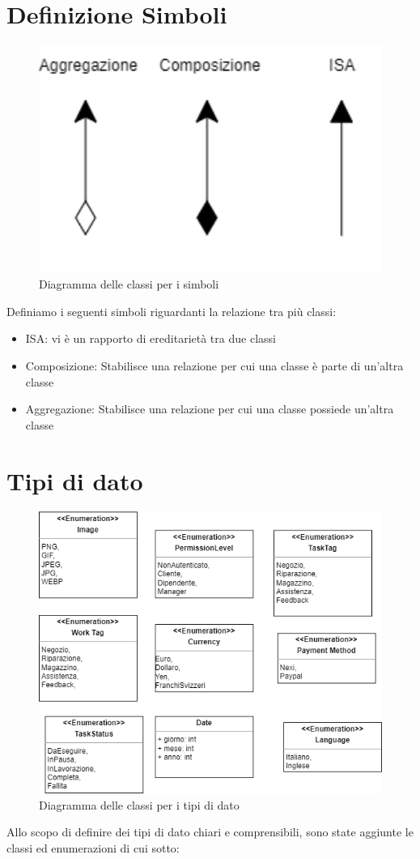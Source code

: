 \documentclass{report}
\begin{document}
\section{Definizione Simboli}
\begin{figure}[H]
	\centering\includegraphics[width=1\textwidth]{images/Diagramma_delle_classi_definizioni.png}
	Diagramma delle classi per i simboli 
\end{figure}
Definiamo i seguenti simboli riguardanti la relazione tra più classi:
\begin{itemize}
	\item ISA: vi è un rapporto di ereditarietà tra due classi
	\item Composizione: Stabilisce una relazione per cui una classe è parte di un'altra classe
	\item Aggregazione: Stabilisce una relazione per cui una classe possiede un'altra classe 
\end{itemize}
\section{Tipi di dato}
\begin{figure}[H]
	\centering\includegraphics[width=1\textwidth]{images/Diagramma_delle_classi_Enumi.png}
	Diagramma delle classi per i tipi di dato
\end{figure}
Allo scopo di definire dei tipi di dato chiari e comprensibili, sono state aggiunte le classi ed enumerazioni di cui sotto:
\end{document}
